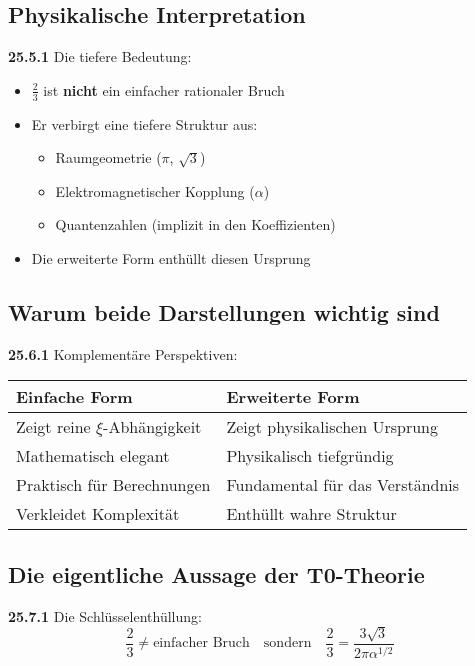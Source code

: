 \documentclass[12pt,a4paper]{article}
\begin{document}
\subsection{Physikalische Interpretation}

\noindent \textbf{25.5.1} Die tiefere Bedeutung:
\begin{itemize}
	\item $\frac{2}{3}$ ist \textbf{nicht} ein einfacher rationaler Bruch
	\item Er verbirgt eine tiefere Struktur aus:
	\begin{itemize}
		\item Raumgeometrie ($\pi$, $\sqrt{3}$)
		\item Elektromagnetischer Kopplung ($\alpha$)
		\item Quantenzahlen (implizit in den Koeffizienten)
	\end{itemize}
	\item Die erweiterte Form enthüllt diesen Ursprung
\end{itemize}

\subsection{Warum beide Darstellungen wichtig sind}

\noindent \textbf{25.6.1} Komplementäre Perspektiven:

\begin{tabular}{p{}p{}}
	\textbf{Einfache Form} & \textbf{Erweiterte Form} \\
	\hline
	Zeigt reine $\xi$-Abhängigkeit & Zeigt physikalischen Ursprung \\
	Mathematisch elegant & Physikalisch tiefgründig \\
	Praktisch für Berechnungen & Fundamental für das Verständnis \\
	Verkleidet Komplexität & Enthüllt wahre Struktur \\
\end{tabular}

\subsection{Die eigentliche Aussage der T0-Theorie}

\noindent \textbf{25.7.1} Die Schlüsselenthüllung:
\[
\boxed{
	\frac{2}{3} \neq \text{einfacher Bruch} \quad \text{sondern} \quad \frac{2}{3} = \frac{3\sqrt{3}}{2\pi\alpha^{1/2}}
}
\]
\end{document}
